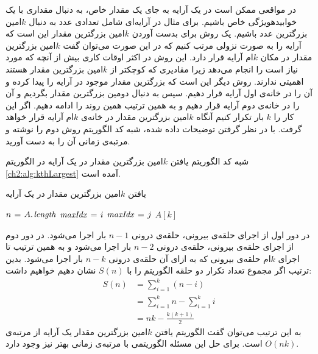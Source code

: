  در مواقعی ممکن است در یک آرایه به جای یک مقدار خاص، به دنبال مقداری با یک ‌خوابیده{ویژگی} خاص باشیم. برای مثال در آرایه‌ای شامل تعدادی عدد به دنبال {$k$}امین بزرگترین عدد باشیم. یک روش برای بدست آوردن {$k$}امین بزرگترین مقدار این است که آرایه را به صورت نزولی مرتب کنیم که در این صورت می‌توان گفت {$k$}امین بزرگترین مقدار در مکان {$k$}ام آرایه قرار دارد. این روش در اکثر اوقات کاری بیش از آنچه که مورد نیاز است را انجام می‌دهد زیرا مقادیری که کوچکتر از {$k$}امین بزرگترین مقدار هستند اهمیتی ندارند. روش دیگر این است که بزرگترین مقدار موجود در آرایه را پیدا کرده و  آن را در خانه‌ی اول آرایه قرار دهیم. سپس به دنبال دومین بزرگترین مقدار بگردیم و آن را در خانه‌ی دوم آرایه قرار دهیم و به همین ترتیب همین روند را ادامه دهیم. اگر این کار را {$k$} بار تکرار کنیم آنگاه {$k$}امین بزرگترین مقدار در خانه‌ی {$k$}ام آرایه قرار خواهد گرفت. با در نظر گرفتن توضیحات داده ‌شده، شبه کد الگوریتم روش دوم را نوشته و مرتبه‌ی زمانی آن را به دست آورید.


شبه کد الگوریتم یافتن {$k$}امین بزرگترین مقدار در یک آرایه در الگوریتم {\eqref{ch2:alg:kthLargest}} آمده است.

\begin{algorithm}
\caption{یافتن {$k$}امین بزرگترین مقدار در یک آرایه}\label{ch2:alg:kthLargest}
\begin{latin}
\begin{algorithmic}[1]
		\State	$n \mathrel{\hspace{1pt}=\hspace{1pt}} A.\hspace*{1pt}\mathit{length}$
				\State	$\mathit{maxIdx} \mathrel{\hspace{1pt}=\hspace{1pt}} i $
								\State	$\mathit{maxIdx} \mathrel{\hspace{1pt}=\hspace{1pt}} j$						
						\EndIf
				\EndFor
				\State	{}
		\EndFor
		\State	\Return $A[k]$
\EndFunction
\end{algorithmic}
\end{latin}
\end{algorithm}

در دور اول از اجرای حلقه‌ی بیرونی، حلقه‌ی درونی {$n-1$} بار اجرا می‌شود. در دور دوم از اجرای حلقه‌ی بیرونی، حلقه‌ی درونی {$n-2$} بار اجرا می‌شود و به همین ترتیب تا اجرای {$k$}ام حلقه‌ی بیرونی که به ازای آن حلقه‌ی درونی {$n-k$} بار اجرا می‌شود. بدین ترتیب اگر مجموع تعداد تکرار دو حلقه الگوریتم {} را با {$S(n)$} نشان دهیم خواهیم داشت:
\begin{align*}
S(n)&=\sum_{i=1}^{k}{(n-i)}\\
	&=\sum_{i=1}^{k}{n} - \sum_{i=1}^{k}{i}\\
	&=nk-\frac{k(k+1)}{2}
\end{align*}
به این ترتیب می‌توان گفت الگوریتم یافتن {$k$}امین بزرگترین مقدار یک آرایه از مرتبه‌ی {$O(nk)$} است. برای حل این مسئله الگوریتمی با مرتبه‌ی زمانی بهتر نیز وجود دارد.

